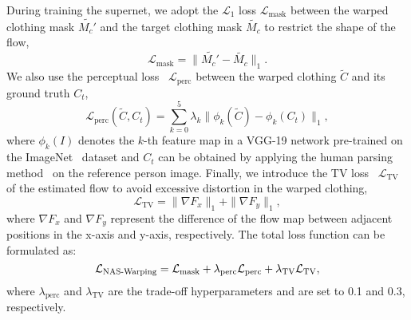 \documentclass[sigconf]{acmart}
\begin{document}
During training the supernet, we adopt the $\mathcal{L}_1$ loss $\mathcal{L}_{\text{mask}}$ between the warped clothing mask $\widetilde{M_c'}$ and the target clothing mask $\widetilde{M_c}$ to restrict the shape of the flow,
\begin{equation}
    \mathcal{L}_{\text{mask}} = \|\widetilde{M_c'}-\widetilde{M_c}\|_1.
\end{equation}
We also use the perceptual loss~\cite{johnson2016perceptual} $\mathcal{L}_{\text{perc}}$ between the warped clothing $\widetilde{C}$ and its ground truth $C_t$,  
\begin{equation}
\mathcal{L}_{\text{perc}}(\widetilde{C},C_t) = \sum_{k=0}^5 \lambda_{k}\|\phi_{k}(\widetilde{C})-\phi_{k}(C_t)\|_1,
\label{eq:warping_loss}
\end{equation}
where $\phi_k(I)$ denotes the $k$-th feature map in a VGG-19 network pre-trained on the ImageNet~\cite{ILSVRC15} dataset and $C_t$ can be obtained by applying the human parsing method~\cite{Gong_2019_CVPR} on the reference person image.
Finally, we introduce the TV loss~\cite{zach2007tv} $\mathcal{L}_{\text{TV}}$ of the estimated flow to avoid excessive distortion in the warped clothing, 
\begin{equation}
    \mathcal{L}_{\text{TV}} = \|\nabla F_x \|_1 + \|\nabla F_y \|_1,
\end{equation}
where $\nabla F_x$ and $\nabla F_y$ represent the difference of the flow map between adjacent positions in the x-axis and y-axis, respectively.
The total loss function can be formulated as:
\begin{equation}
     \mathcal{L}_{\text{NAS\\-Warping}} = \mathcal{L}_{\text{mask}} + \lambda_{\text{perc}}\mathcal{L}_{\text{perc}} + \lambda_{\text{TV}}\mathcal{L}_{\text{TV}},
\end{equation}
where $\lambda_{\text{perc}}$ and $\lambda_{\text{TV}}$ are the trade-off hyperparameters and are set to 0.1 and 0.3, respectively. 
\end{document}
